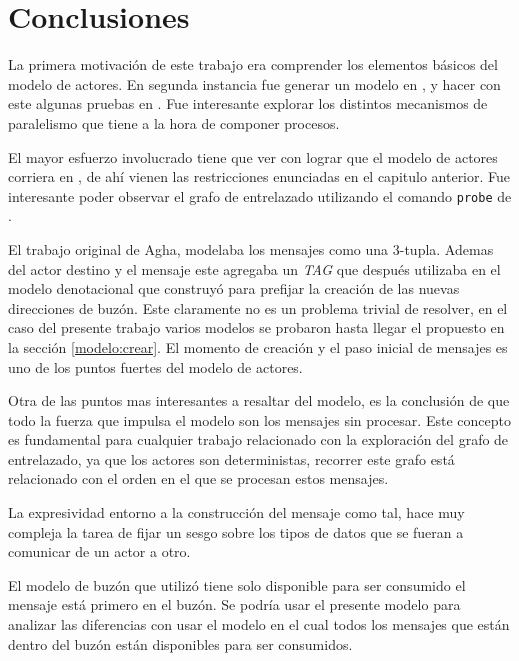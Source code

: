 \chapter{Conclusiones}

La primera motivación de este trabajo era comprender los elementos básicos del modelo de actores. En segunda instancia fue generar un modelo en \CSP, y hacer con este algunas pruebas en \FDR. Fue interesante explorar los distintos mecanismos de paralelismo que tiene \CSP a la hora de componer procesos.

El mayor esfuerzo involucrado tiene que ver con lograr que el modelo de actores corriera en \FDR, de ahí vienen las restricciones enunciadas en el capitulo anterior. Fue interesante poder observar el grafo de entrelazado utilizando el comando \verb=probe= de \FDR. 

El trabajo original de Agha\cite{Agha:1986:AMC:7929}, modelaba los mensajes como una 3-tupla. Ademas del actor destino y el mensaje este agregaba un \textit{TAG} que después utilizaba en el modelo denotacional que construyó para prefijar la creación de las nuevas direcciones de buzón. Este claramente no es un problema trivial de resolver, en el caso del presente trabajo varios modelos se probaron hasta llegar el propuesto en la sección \ref{modelo:crear}. El momento de creación y el paso inicial de mensajes es uno de los puntos fuertes del modelo de actores.

Otra de las puntos mas interesantes a resaltar del modelo, es la conclusión de que todo la fuerza que impulsa el modelo son los mensajes sin procesar. Este concepto es fundamental para cualquier trabajo relacionado con la exploración del grafo de entrelazado, ya que los actores son deterministas, recorrer este grafo está relacionado con el orden en el que se procesan estos mensajes.

La expresividad entorno a la construcción del mensaje como tal, hace muy compleja la tarea de fijar un sesgo sobre los tipos de datos que se fueran a comunicar de un actor a otro.

El modelo de buzón que utilizó tiene solo disponible para ser consumido el mensaje está primero en el buzón. Se podría usar el presente modelo para analizar las diferencias con usar el modelo en el cual todos los mensajes que están dentro del buzón están disponibles para ser consumidos.

